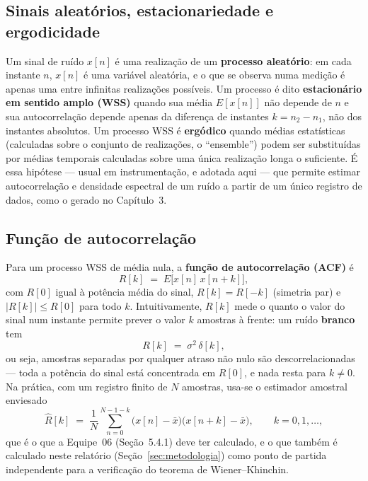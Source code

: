 \subsection{Sinais aleatórios, estacionariedade e ergodicidade}

Um sinal de ruído $x[n]$ é uma realização de um \textbf{processo aleatório}: em cada instante
$n$, $x[n]$ é uma variável aleatória, e o que se observa numa medição é apenas uma entre
infinitas realizações possíveis. Um processo é dito \textbf{estacionário em sentido amplo (WSS)}
quando sua média $E[x[n]]$ não depende de $n$ e sua autocorrelação depende apenas da diferença de
instantes $k=n_2-n_1$, não dos instantes absolutos. Um processo WSS é \textbf{ergódico} quando
médias estatísticas (calculadas sobre o conjunto de realizações, o ``ensemble'') podem ser
substituídas por médias temporais calculadas sobre uma única realização longa o suficiente. É
essa hipótese --- usual em instrumentação, e adotada aqui --- que permite estimar autocorrelação
e densidade espectral de um ruído a partir de um único registro de dados, como o gerado no
Capítulo~3.

\subsection{Função de autocorrelação}
\label{sec:acf-teoria}

Para um processo WSS de média nula, a \textbf{função de autocorrelação (ACF)} é
\begin{equation}
R[k] \;=\; E\big[x[n]\,x[n+k]\big],
\label{eq:acf-def}
\end{equation}
com $R[0]$ igual à potência média do sinal, $R[k]=R[-k]$ (simetria par) e $|R[k]|\le R[0]$ para
todo $k$. Intuitivamente, $R[k]$ mede o quanto o valor do sinal num instante permite prever o
valor $k$ amostras à frente: um ruído \textbf{branco} tem
\begin{equation}
R[k] \;=\; \sigma^2\,\delta[k],
\label{eq:acf-branco}
\end{equation}
ou seja, amostras separadas por qualquer atraso não nulo são descorrelacionadas --- toda a
potência do sinal está concentrada em $R[0]$, e nada resta para $k\neq0$. Na prática, com um
registro finito de $N$ amostras, usa-se o estimador amostral enviesado
\begin{equation}
\hat R[k] \;=\; \frac{1}{N}\sum_{n=0}^{N-1-k} \big(x[n]-\bar x\big)\big(x[n+k]-\bar x\big),
\qquad k=0,1,\dots,
\label{eq:acf-estimador}
\end{equation}
que é o que a Equipe~06 (Seção~5.4.1) deve ter calculado, e o que também é calculado neste
relatório (Seção~\ref{sec:metodologia}) como ponto de partida independente para a verificação do
teorema de Wiener--Khinchin.

